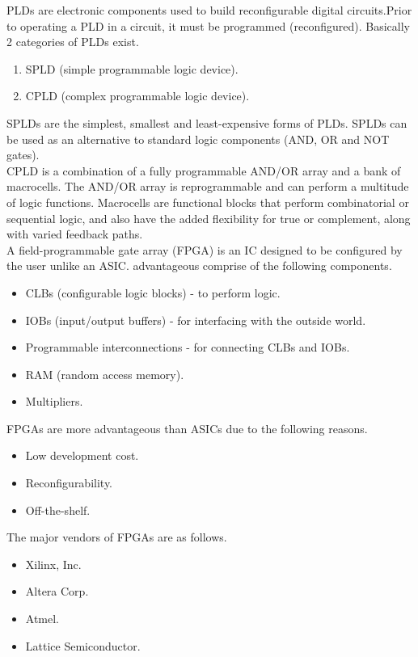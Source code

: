 \noindent
PLDs  are electronic components used to build reconfigurable digital circuits.Prior to operating a PLD in a circuit, it must be programmed (reconfigured). Basically 2 categories of PLDs exist.

\begin{enumerate}
	\item SPLD (simple programmable logic device).
	\item CPLD (complex programmable logic device).
\end{enumerate}

\noindent
SPLDs are the simplest, smallest and least-expensive forms of PLDs. SPLDs can be used as an alternative to standard logic components (AND, OR and NOT gates).\\

\noindent
CPLD is a combination of a fully programmable AND/OR array and a bank of macrocells. The AND/OR array is reprogrammable and can perform a multitude of logic functions. Macrocells are functional blocks that perform combinatorial or sequential logic, and also have the added flexibility for true or complement, along with varied feedback paths.\\

\noindent
A field-programmable gate array (FPGA) is an IC designed to be configured by the user unlike an ASIC. advantageous comprise of the following components.
\begin{itemize}
	\item CLBs (configurable logic blocks) - to perform logic.
	\item IOBs (input/output buffers) - for interfacing with the outside world.
	\item Programmable interconnections - for connecting CLBs and IOBs.
	\item RAM (random access memory).
	\item Multipliers.	
\end{itemize}

\noindent
FPGAs are more advantageous than ASICs due to the following reasons.
\begin{itemize}
	\item Low development cost.
	\item Reconfigurability. 
	\item Off-the-shelf.
\end{itemize}

\noindent
The major vendors of FPGAs are as follows.
\begin{itemize}
	\item Xilinx, Inc.
	\item Altera Corp.
	\item Atmel.
	\item Lattice Semiconductor.
\end{itemize}

